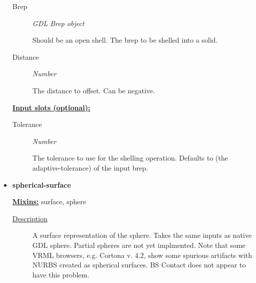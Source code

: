 \documentclass [11pt]{book}
\begin{document}
\begin{itemize}
\begin{description}

\item [Brep]
\emph{GDL Brep object}

 Should be an open shell.
The brep to be shelled into a solid.




\item [Distance]
\emph{Number}

 The distance to offset. Can be negative.




\end{description}






\textbf{
\underline{Input slots (optional):}}

\begin{description}

\item [Tolerance]
\emph{Number}

 The tolerance to use for the shelling operation.
Defaults to (the adaptive-tolerance) of the input brep.




\end{description}







\item {}
\label{prim:spherical-surface}
\textbf{spherical-surface}


\textbf{
\underline{Mixins:}} surface, sphere





\begin{description}

\item [
\underline{Description}]


A surface representation of the sphere. Takes the same inputs as native GDL sphere. Partial spheres are not yet implmented.
Note that some VRML browsers, e.g. Cortona v. 4.2, show some spurious artifacts with NURBS 
created as spherical surfaces. BS Contact does not appear to have this problem.



\end{description}





\end{itemize}
\end{document}
